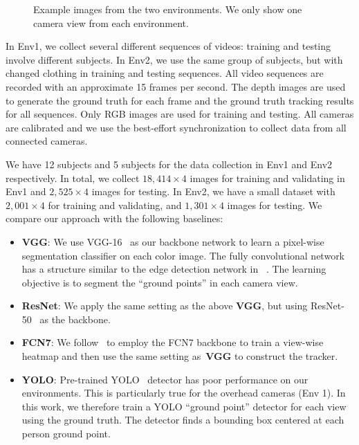 \documentclass{article}
\begin{document}
\begin{figure}[!htbp]
	\begin{center}
	\end{center}
	\caption{Example images from the two environments. We only show one camera view from each environment.}
	\label{fig:studiox}
\end{figure}

In Env1, we collect several different sequences of videos: training and testing involve different subjects. 
In Env2, we use the same group of subjects, but with changed clothing in training and testing sequences.
All video sequences are recorded with an approximate 15 frames per second. The depth images are used to generate the ground truth for each frame and the ground truth tracking results for all
sequences.
Only RGB images are used for training and testing. All cameras are calibrated and we use the best-effort synchronization to collect data from all connected cameras. 

We have 12 subjects and 5 subjects for the data collection in Env1 and Env2 respectively. 
In total, we collect $18,414 \times 4$ images for training and validating in Env1 and $2,525 \times 4$ images for testing. 
In Env2, we have a small dataset with $2,001 \times 4$ for training and validating, and $1,301 \times 4$ images for testing. 
We compare our approach with the following baselines:
\begin{itemize}
\item {\textbf{VGG}: We use VGG-16~\cite{simonyan2014very} as our backbone network to learn a pixel-wise segmentation classifier on each color image. 
The fully convolutional network has a structure similar to the edge detection network in ~\cite{HED}.
The learning objective is to segment the ``ground points'' in each camera view.}
	\item{\textbf{ResNet}: We apply the same setting as the above \textbf{VGG}, but using ResNet-50~\cite{he2016deep} as the backbone.}
	\item{\textbf{FCN7}}: We follow~\cite{count19} to employ the FCN7 backbone to train a view-wise heatmap and then use the same setting as~\textbf{VGG} to construct the tracker.
	\item{\textbf{YOLO}: Pre-trained YOLO~\cite{yolo} detector has poor performance on our environments. This is particularly true for the overhead cameras (Env 1).  In this work,
		we therefore train a YOLO ``ground point'' detector for each view using the ground truth.
                The detector finds a bounding box centered at each person ground point.  
}
\end{itemize}
\end{document}
